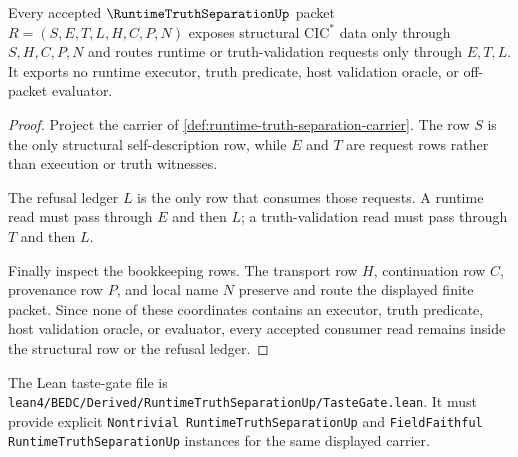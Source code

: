 \begin{theorem}
\label{thm:runtime-truth-separation-nonescape}
Every accepted $\RuntimeTruthSeparationUp$ packet $R=(S,E,T,L,H,C,P,N)$ exposes structural $\mathrm{CIC}^{*}$ data only through $S,H,C,P,N$ and routes runtime or truth-validation requests only through $E,T,L$. It exports no runtime executor, truth predicate, host validation oracle, or off-packet evaluator.
\end{theorem}
\begin{proof}
Project the carrier of \autoref{def:runtime-truth-separation-carrier}. The row $S$ is the only structural self-description row, while $E$ and $T$ are request rows rather than execution or truth witnesses.

The refusal ledger $L$ is the only row that consumes those requests. A runtime read must pass through $E$ and then $L$; a truth-validation read must pass through $T$ and then $L$.

Finally inspect the bookkeeping rows. The transport row $H$, continuation row $C$, provenance row $P$, and local name $N$ preserve and route the displayed finite packet. Since none of these coordinates contains an executor, truth predicate, host validation oracle, or evaluator, every accepted consumer read remains inside the structural row or the refusal ledger.
\end{proof}



The Lean taste-gate file is \texttt{lean4/BEDC/Derived/RuntimeTruthSeparationUp/TasteGate.lean}. It must provide explicit \texttt{Nontrivial RuntimeTruthSeparationUp} and \texttt{FieldFaithful RuntimeTruthSeparationUp} instances for the same displayed carrier.


